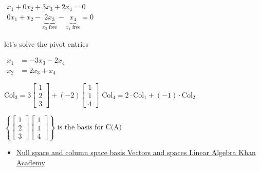 \documentclass[11pt]{article}
\providecommand{\tightlist}{%
      \setlength{\itemsep}{0pt}\setlength{\parskip}{0pt}}
\begin{document}
\(\begin{align}
x_1 + 0 x_2 + 3 x_3 + 2 x_4 = 0 \\
0 x_1 + x_2 - \underbrace{2 x_3}_{x_3\text{ free}} -   \underbrace{x_4}_{x_4\text{ free}} = 0
\end{align}\)

let's solve the pivot entries

\(\begin{align}
x_1 &= - 3 x_3 - 2 x_4 \\
x_2 &= 2 x_3 + x_4
\end{align}\)

\(\text{Col}_3 = 3 \begin{bmatrix}
       1 \\
       2 \\
       3
    \end{bmatrix} + (-2)
    \begin{bmatrix}
       1 \\
       1 \\
       4
    \end{bmatrix}\)
\(\text{Col}_4 = 2 \cdot \text{Col}_1 + (-1) \cdot \text{Col}_2\)

\(\left\{ \begin{bmatrix}
       1 \\
       2 \\
       3
    \end{bmatrix}
    \begin{bmatrix}
       1 \\
       1 \\
       4
    \end{bmatrix}
\right\} \text{ is the basis for C(A) }\)

    \begin{itemize}
\tightlist
\item
  \href{https://www.youtube.com/watch?v=_uTAdf_AsfQ}{Null space and
  column space basis \textbar{} Vectors and spaces \textbar{} Linear
  Algebra \textbar{} Khan Academy}
\end{itemize}


    
    
    
\end{document}
